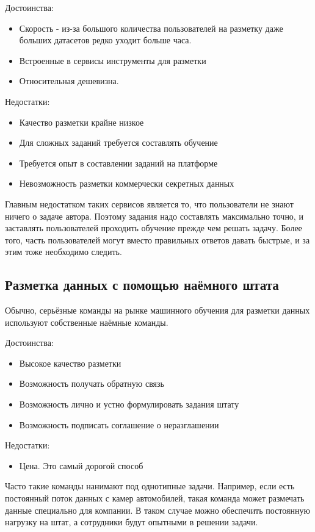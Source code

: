 Достоинства:
\begin{itemize}
    \item Скорость - из-за большого количества пользователей на разметку даже больших датасетов редко уходит больше часа.
    \item Встроенные в сервисы инструменты для разметки
    \item Относительная дешевизна.
\end{itemize}
Недостатки:
\begin{itemize}
    \item Качество разметки крайне низкое
    \item Для сложных заданий требуется составлять обучение
    \item Требуется опыт в составлении заданий на платформе
    \item Невозможность разметки коммерчески секретных данных
\end{itemize}
Главным недостатком таких сервисов является то, что пользователи не знают ничего о задаче автора. Поэтому задания надо составлять максимально точно, и заставлять пользователей проходить обучение прежде чем решать задачу. Более того, часть пользователей могут вместо правильных ответов давать быстрые, и за этим тоже необходимо следить.

\subsection{Разметка данных с помощью наёмного штата} \label{subsect1_3_3}
Обычно, серьёзные команды на рынке машинного обучения для разметки данных используют собственные наёмные команды.

Достоинства:
\begin{itemize}
    \item Высокое качество разметки
    \item Возможность получать обратную связь
    \item Возможность лично и устно формулировать задания штату
    \item Возможность подписать соглашение о неразглашении
\end{itemize}
Недостатки:
\begin{itemize}
    \item Цена. Это самый дорогой способ
\end{itemize}
Часто такие команды нанимают под однотипные задачи. Например, если есть постоянный поток данных с камер автомобилей, такая команда может размечать данные специально для компании. В таком случае можно обеспечить постоянную нагрузку на штат, а сотрудники будут опытными в решении задачи.